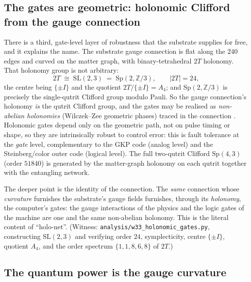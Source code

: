 \documentclass[11pt]{article}
\begin{document}
\subsection{The gates are geometric: holonomic Clifford from the gauge connection}

There is a third, gate-level layer of robustness that the substrate supplies for
free, and it explains the name. The substrate gauge connection is flat along the
$240$ edges and curved on the matter graph, with binary-tetrahedral $2T$
holonomy. That holonomy group is not arbitrary:
\[
  2T \;\cong\; \mathrm{SL}(2,3)\;=\;\mathrm{Sp}(2,\mathbb Z/3),\qquad |2T|=24,
\]
the centre being $\{\pm I\}$ and the quotient $2T/\{\pm I\}=A_4$; and
$\mathrm{Sp}(2,\mathbb Z/3)$ is precisely the single-qutrit Clifford group
modulo Pauli. So the gauge connection's holonomy \emph{is} the qutrit Clifford
group, and the gates may be realised as \emph{non-abelian holonomies}
(Wilczek--Zee geometric phases) traced in the connection
\cite{zanardi-rasetti,wilczek-zee}. Holonomic gates depend only on the geometric
path, not on pulse timing or shape, so they are intrinsically robust to control
error: this is fault tolerance at the \emph{gate} level, complementary to the GKP
code (analog level) and the Steinberg/color outer code (logical level). The full
two-qutrit Clifford $\mathrm{Sp}(4,3)$ (order $51840$) is generated by the
matter-graph holonomy on each qutrit together with the entangling network.

The deeper point is the identity of the connection. The \emph{same} connection
whose \emph{curvature} furnishes the substrate's gauge fields furnishes, through
its \emph{holonomy}, the computer's gates: the gauge interactions of the physics
and the logic gates of the machine are one and the same non-abelian holonomy.
This is the literal content of ``holo-net''. (Witness:
\texttt{analysis/w33\_holonomic\_gates.py}, constructing $\mathrm{SL}(2,3)$ and
verifying order $24$, symplecticity, centre $\{\pm I\}$, quotient $A_4$, and the
order spectrum $\{1,1,8,6,8\}$ of $2T$.)

\subsection{The quantum power is the gauge curvature}
\label{sec:curvature-is-computation}
\end{document}

